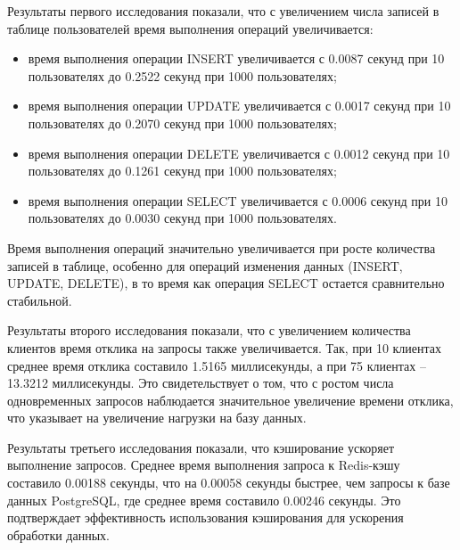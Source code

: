 Результаты первого исследования показали, что с увеличением числа записей в таблице пользователей время выполнения операций увеличивается:
\begin{itemize}
	\item время выполнения операции INSERT увеличивается с 0.0087 секунд при 10 пользователях до 0.2522 секунд при 1000 пользователях;
	\item время выполнения операции UPDATE увеличивается с 0.0017 секунд при 10 пользователях до 0.2070 секунд при 1000 пользователях;
	\item время выполнения операции DELETE увеличивается с 0.0012 секунд при 10 пользователях до 0.1261 секунд при 1000 пользователях;
	\item время выполнения операции SELECT увеличивается с 0.0006 секунд при 10 пользователях до 0.0030 секунд при 1000 пользователях.
\end{itemize}

Время выполнения операций значительно увеличивается при росте количества записей в таблице, особенно для операций изменения данных (INSERT, UPDATE, DELETE), в то время как операция SELECT остается сравнительно стабильной.

Результаты второго исследования показали, что с увеличением количества клиентов время отклика на запросы также увеличивается. Так, при 10 клиентах среднее время отклика составило 1.5165 миллисекунды, а при 75 клиентах -- 13.3212 миллисекунды. Это свидетельствует о том, что с ростом числа одновременных запросов наблюдается значительное увеличение времени отклика, что указывает на увеличение нагрузки на базу данных.

Результаты третьего исследования показали, что кэширование ускоряет выполнение запросов. Среднее время выполнения запроса к Redis-кэшу составило 0.00188 секунды, что на 0.00058 секунды быстрее, чем запросы к базе данных PostgreSQL, где среднее время составило 0.00246 секунды. Это подтверждает эффективность использования кэширования для ускорения обработки данных.
